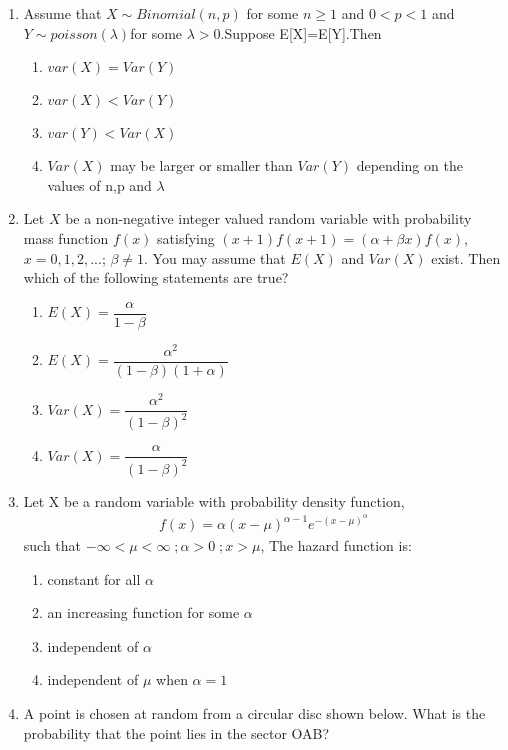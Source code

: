 \begin{enumerate}[label=\thesection.\arabic*.,ref=\thesection.\theenumi]
\item Assume that $X\sim Binomial(n, p)$ for some $n\geq 1$ and $0<p<1$
and $Y\sim poisson(\lambda)$for some $\lambda > 0$.Suppose E[X]=E[Y].Then
\begin{enumerate}
    \item $var(X)=Var(Y)$\\
    \item $var(X)<Var(Y)$\\
    \item $var(Y)<Var(X)$\\
    \item $Var(X)$ may be larger or smaller than $Var(Y)$ depending on the values of n,p and $\lambda$
\end{enumerate}
%
%
\solution

%
%
\item Let $X$ be a non-negative integer valued random variable with probability mass function $f(x)$ satisfying $(x+1)f(x+1)=(\alpha + \beta x)f(x)$, $x=0,1,2,...$; $\beta \neq 1$. You may assume that $E(X)$ and $Var(X)$ exist. Then which of the following statements are true?

\begin{enumerate}
    \item $E(X)=\dfrac{\alpha}{1-\beta}$ \vspace{0.2cm}
    \item $E(X)=\dfrac{\alpha^2}{(1-\beta)(1+\alpha)}$ \vspace{0.2cm}
    \item $Var(X)=\dfrac{\alpha^2}{(1-\beta)^2}$ \vspace{0.2cm}
    \item $Var(X)=\dfrac{\alpha}{(1-\beta)^2}$
\end{enumerate}
%
\solution

%
\item Let X be a random variable with probability density function,
\begin{align}
    f(x)=\alpha(x-\mu)^{\alpha-1}e^{-(x-\mu)^{\alpha}}
\end{align}
such that $-\infty<\mu<\infty\;;\alpha>0\;;x>\mu$, The hazard function is: 
\begin{enumerate}
    \item constant for all $\alpha$
    \item an increasing function for some $\alpha$
    \item independent of $\alpha$
    \item independent of $\mu$ when $\alpha=1$
\end{enumerate}
%
\solution

%
\item 
A point is chosen at random from a circular disc shown below. What is the probability that the point lies in the sector OAB?\\


\end{enumerate}
